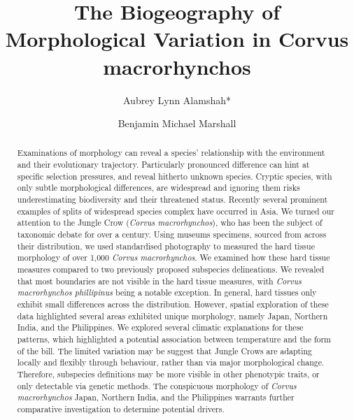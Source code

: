 \documentclass[10pt,a4paper]{article}
\begin{document}
\pagestyle{fancy}

\title{The Biogeography of Morphological Variation in Corvus macrorhynchos}
\author[1]{Aubrey Lynn Alamshah*}
\author[2]{Benjamin Michael Marshall}

\maketitle
\thispagestyle{fancy}

\begin{abstract}

Examinations of morphology can reveal a species' relationship with the environment and their evolutionary trajectory. Particularly pronounced difference can hint at specific selection pressures, and reveal hitherto unknown species. Cryptic species, with only subtle morphological differences, are widespread and ignoring them risks underestimating biodiversity and their threatened status. Recently several prominent examples of splits of widespread species complex have occurred in Asia. We turned our attention to the Jungle Crow (\emph{Corvus macrorhynchos}), who has been the subject of taxonomic debate for over a century. Using museums specimens, sourced from across their distribution, we used standardised photography to measured the hard tissue morphology of over 1,000 \emph{Corvus macrorhynchos}. We examined how these hard tissue measures compared to two previously proposed subspecies delineations. We revealed that most boundaries are not visible in the hard tissue measures, with \emph{Corvus macrorhynchos phillipinus} being a notable exception. In general, hard tissues only exhibit small differences across the distribution. However, spatial exploration of these data highlighted several areas exhibited unique morphology, namely Japan, Northern India, and the Philippines. We explored several climatic explanations for these patterns, which highlighted a potential association between temperature and the form of the bill. The limited variation may be suggest that Jungle Crows are adapting locally and flexibly through behaviour, rather than via major morphological change. Therefore, subspecies definitions may be more visible in other phenotypic traits, or only detectable via genetic methods. The conspicuous morphology of \emph{Corvus macrorhynchos} Japan, Northern India, and the Philippines warrants further comparative investigation to determine potential drivers.

\end{abstract}
\end{document}
